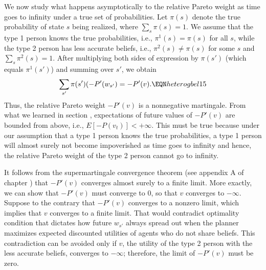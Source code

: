 We now study what happens asymptotically to the relative
Pareto weight as time goes to
infinity under a true set of probabilities.
Let $\pi(s)$ denote the true probability of 
state $s$ being realized, where 
$\sum_{s} \pi(s) =1$. We assume that 
the type 1 person knows the true probabilities, 
i.e., $\pi^1(s)=\pi(s)$ for all $s$, while
the type 2 person has less accurate beliefs, i.e.,
$\pi^2(s) \neq \pi(s)$ for some $s$ and
$\sum_{s} \pi^2(s) =1$. After multiplying both sides 
of expression  by $\pi(s')$
(which equals $\pi^1(s')$) and summing over $s'$, 
we obtain
$$
\sum_{s'} \pi(s') (-P'(w_{s'}) = -P'(v) .    
                             \EQN heterogbel15 $$
Thus, the relative Pareto weight $-P'(v)$ is 
a nonnegative martingale. From what we 
learned in section ,
expectations of future values of $-P'(v)$ are
bounded from above, i.e., $E[-P(v_t)]<+\infty$.
This must be true because under our assumption that
a type 1 person knows the true probabilities,
a  type 1 person will almost surely not become
impoverished  as
time goes to infinity and 
hence, the relative Pareto weight of the 
type 2 person cannot go to infinity.

It follows from the supermartingale convergence
theorem (see appendix A of chapter ) 
that $-P'(v)$ converges almost surely to a finite
limit. More exactly, we can show that $-P'(v)$ must converge 
to $0$, so that $v$ converges to $-\infty$. 
Suppose to the contrary that $-P'(v)$ converges 
to a nonzero limit, which implies that $v$ 
converges to a finite limit. That would
contradict optimality condition 
that dictates how future $w_{s'}$ always 
spread out when the planner maximizes 
expected discounted utilities of agents who
do not share beliefs. This 
contradiction can be avoided only if $v$, the
utility of the type 2 person with the less
accurate beliefs, converges to $-\infty$; 
therefore, the limit of
$-P'(v)$ must be zero.













